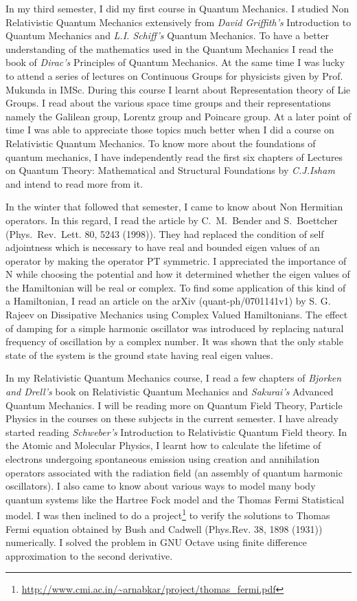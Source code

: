 \documentclass[12pt,a4paper,oneside]{amsart}
\begin{document}
In my third semester, I did my first course in Quantum Mechanics. I studied Non Relativistic Quantum Mechanics extensively from \textit{David Griffith's} Introduction to Quantum Mechanics and \textit{L.I. Schiff's} Quantum Mechanics. To have a better understanding of the mathematics used in the Quantum Mechanics I read the book of \textit{Dirac's} Principles of Quantum Mechanics. At the same time I was lucky to attend a series of lectures on Continuous Groups for physicists given by Prof. Mukunda in IMSc. During this course I learnt about Representation theory of Lie Groups. I read about the various space time groups and their representations namely the Galilean group, Lorentz group and Poincare group. At a later point of time I was able to appreciate those topics much better when I did a course on Relativistic Quantum Mechanics.
To know more about the foundations of quantum mechanics, I have independently read the first six chapters of Lectures on Quantum Theory: Mathematical and Structural Foundations by \textit{C.J.Isham} and intend to read more from it.

In the winter that followed that semester, I came to know about Non Hermitian operators. In this regard, I read the article by C.~M.~Bender and S.~Boettcher (Phys.~Rev.~Lett. 80, 5243 (1998)). They had replaced the condition of self adjointness which is necessary to have real and bounded eigen values of an operator by making the operator PT symmetric. I appreciated the importance of N while choosing the potential and how it determined whether the eigen values of the Hamiltonian will be real or complex. To find some application of this kind of a Hamiltonian, I read an article on the arXiv (quant-ph/0701141v1) by S. G. Rajeev on Dissipative Mechanics using Complex Valued Hamiltonians. The effect of damping for a simple harmonic oscillator was introduced by replacing natural frequency of oscillation by a complex number. It was shown that the only stable state of the system is the ground state having real eigen values. 

In my Relativistic Quantum Mechanics course, I read a few chapters of \textit{Bjorken and Drell's} book on Relativistic Quantum Mechanics and \textit{Sakurai's} Advanced Quantum Mechanics. I will be reading more on Quantum Field Theory, Particle Physics in the courses on these subjects in the current semester. I have already started reading \textit{Schweber's} Introduction to Relativistic Quantum Field theory. In the Atomic and Molecular Physics, I learnt how to calculate the lifetime of electrons undergoing spontaneous emission using creation and annihilation operators associated with the radiation field (an assembly of quantum harmonic oscillators). I also came to know about various ways to model many body quantum systems like the Hartree Fock model and the Thomas Fermi Statistical model. I was then inclined to do a  project\footnote{\url{http://www.cmi.ac.in/~arnabkar/project/thomas_fermi.pdf}} to verify the solutions to Thomas Fermi equation obtained by Bush and Cadwell (Phys.Rev. 38, 1898 (1931)) numerically. I solved the problem in GNU Octave using finite difference approximation to the second derivative. 
\end{document}

